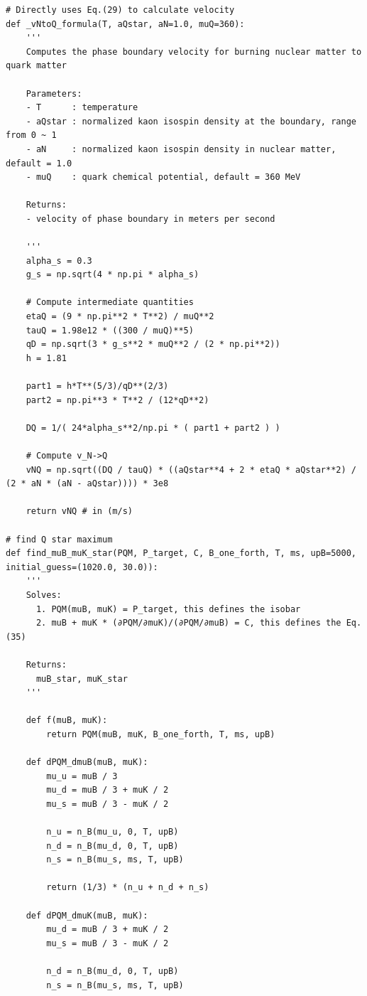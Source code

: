 \documentclass[12pt]{article}
\begin{document}
\begin{lstlisting}[style=mypython]
# Directly uses Eq.(29) to calculate velocity
def _vNtoQ_formula(T, aQstar, aN=1.0, muQ=360):
    '''
    Computes the phase boundary velocity for burning nuclear matter to quark matter

    Parameters:
    - T      : temperature
    - aQstar : normalized kaon isospin density at the boundary, range from 0 ~ 1
    - aN     : normalized kaon isospin density in nuclear matter, default = 1.0
    - muQ    : quark chemical potential, default = 360 MeV

    Returns:
    - velocity of phase boundary in meters per second

    '''
    alpha_s = 0.3
    g_s = np.sqrt(4 * np.pi * alpha_s)

    # Compute intermediate quantities
    etaQ = (9 * np.pi**2 * T**2) / muQ**2
    tauQ = 1.98e12 * ((300 / muQ)**5)
    qD = np.sqrt(3 * g_s**2 * muQ**2 / (2 * np.pi**2))
    h = 1.81

    part1 = h*T**(5/3)/qD**(2/3)
    part2 = np.pi**3 * T**2 / (12*qD**2)

    DQ = 1/( 24*alpha_s**2/np.pi * ( part1 + part2 ) )

    # Compute v_N->Q
    vNQ = np.sqrt((DQ / tauQ) * ((aQstar**4 + 2 * etaQ * aQstar**2) / (2 * aN * (aN - aQstar)))) * 3e8
    
    return vNQ # in (m/s)
    
# find Q star maximum
def find_muB_muK_star(PQM, P_target, C, B_one_forth, T, ms, upB=5000, initial_guess=(1020.0, 30.0)):
    '''
    Solves:
      1. PQM(muB, muK) = P_target, this defines the isobar
      2. muB + muK * (∂PQM/∂muK)/(∂PQM/∂muB) = C, this defines the Eq.(35)

    Returns:
      muB_star, muK_star
    '''

    def f(muB, muK):
        return PQM(muB, muK, B_one_forth, T, ms, upB)

    def dPQM_dmuB(muB, muK):
        mu_u = muB / 3
        mu_d = muB / 3 + muK / 2
        mu_s = muB / 3 - muK / 2

        n_u = n_B(mu_u, 0, T, upB)
        n_d = n_B(mu_d, 0, T, upB)
        n_s = n_B(mu_s, ms, T, upB)

        return (1/3) * (n_u + n_d + n_s)

    def dPQM_dmuK(muB, muK):
        mu_d = muB / 3 + muK / 2
        mu_s = muB / 3 - muK / 2

        n_d = n_B(mu_d, 0, T, upB)
        n_s = n_B(mu_s, ms, T, upB)


\end{lstlisting}
\end{document}
